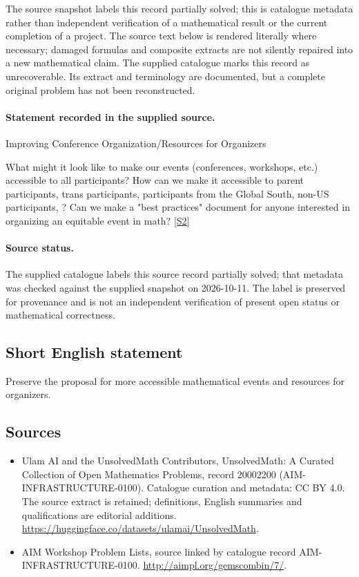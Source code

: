 \documentclass[11pt]{article}
\newcommand{\sref}[2]{\hyperlink{source:#1:#2}{[S#2]}}
\begin{document}
The source snapshot labels this record partially solved; this is catalogue metadata rather than independent verification of a mathematical result or the current completion of a project.
The source text below is rendered literally where necessary; damaged formulas and composite extracts are not silently repaired into a new mathematical claim.
The supplied catalogue marks this record as unrecoverable. Its extract and terminology are documented, but a complete original problem has not been reconstructed.
\paragraph{Statement recorded in the supplied source.}
Improving Conference Organization/Resources for Organizers

What might it look like to make our events (conferences, workshops, etc.) accessible to all participants? How can we make it accessible to parent participants, trans participants, participants from the Global South, non-US participants, ? Can we make a "best practices" document for anyone interested in organizing an equitable event in math? \sref{20002200}{2}
\paragraph{Source status.}
The supplied catalogue labels this source record partially solved; that metadata was checked against the supplied snapshot on 2026-10-11. The label is preserved for provenance and is not an independent verification of present open status or mathematical correctness.
\subsection{Short English statement}
Preserve the proposal for more accessible mathematical events and resources for organizers.
\subsection{Sources}
\begin{itemize}
\item[\hypertarget{source:20002200:1}{S1}] Ulam AI and the UnsolvedMath Contributors, UnsolvedMath: A Curated Collection of Open Mathematics Problems, record 20002200 (AIM-INFRASTRUCTURE-0100). Catalogue curation and metadata: CC BY 4.0. The source extract is retained; definitions, English summaries and qualifications are editorial additions.
\url{https://huggingface.co/datasets/ulamai/UnsolvedMath}.
\item[\hypertarget{source:20002200:2}{S2}] AIM Workshop Problem Lists, source linked by catalogue record AIM-INFRASTRUCTURE-0100.
\url{http://aimpl.org/gemscombin/7/}.
\end{itemize}
\end{document}
